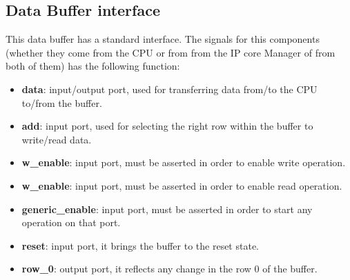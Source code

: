 \subsection{Data Buffer interface}\label{bufinter}
This data buffer has a standard interface.
The signals for this components (whether they come from the CPU or from from the IP core Manager of from both of them) has the following function: 
\begin{itemize}
	\item \textbf{data}: input/output port, used for transferring data from/to the CPU to/from the buffer. 
	\item \textbf{add}: input port, used for selecting the right row within the buffer to write/read data. 
	\item \textbf{w\_enable}: input port, must be asserted in order to enable write operation. 
		\item \textbf{w\_enable}: input port, must be asserted in order to enable read operation.  
		\item \textbf{generic\_enable}: input port, must be asserted in order to start any operation on that port. 
		\item \textbf{reset}: input port, it brings the buffer to the reset state. 
		\item \textbf{row\_0}: output port, it reflects any change in the row 0 of the buffer. 
\end{itemize}
